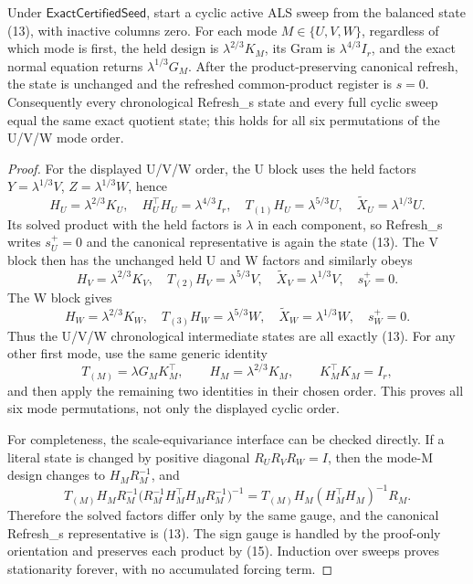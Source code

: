 \begin{proposition}\label{prop:step-013-cyclic-fixed}
Under \(\mathsf{ExactCertifiedSeed}\), start a
cyclic active ALS sweep from the balanced state (13), with inactive columns
zero. For each mode \(M\in\{U,V,W\}\), regardless of which mode is first,
the held design is \(\lambda^{2/3}K_M\), its Gram is
\(\lambda^{4/3}I_r\), and the exact normal equation returns
\(\lambda^{1/3}G_M\). After the product-preserving canonical refresh, the
state is unchanged and the refreshed common-product register is \(s=0\).
Consequently every chronological Refresh\_s state and every full cyclic
sweep equal the same exact quotient state; this holds for all six
permutations of the U/V/W mode order.

\begin{proof}
For the displayed U/V/W order, the U block uses
the held factors \(Y=\lambda^{1/3}V\), \(Z=\lambda^{1/3}W\), hence
\[
H_U=\lambda^{2/3}K_U,\quad H_U^\top H_U=\lambda^{4/3}I_r,\quad
T_{(1)}H_U=\lambda^{5/3}U,\quad
\widetilde X_U=\lambda^{1/3}U.
\tag{16}
\]
Its solved product with the held factors is \(\lambda\) in each component,
so Refresh\_s writes \(s_U^+=0\) and the canonical representative is again
the state (13). The V block then has the unchanged held U and W factors and
similarly obeys
\[
H_V=\lambda^{2/3}K_V,\quad
T_{(2)}H_V=\lambda^{5/3}V,\quad
\widetilde X_V=\lambda^{1/3}V,\quad s_V^+=0.
\tag{17}
\]
The W block gives
\[
H_W=\lambda^{2/3}K_W,\quad
T_{(3)}H_W=\lambda^{5/3}W,\quad
\widetilde X_W=\lambda^{1/3}W,\quad s_W^+=0.
\tag{18}
\]
Thus the U/V/W chronological intermediate states are all exactly (13).
For any other first mode, use the same generic identity
\[
T_{(M)}=\lambda G_MK_M^\top,\qquad
H_M=\lambda^{2/3}K_M,\qquad K_M^\top K_M=I_r,
\tag{19}
\]
and then apply the remaining two identities in their chosen order. This
proves all six mode permutations, not only the displayed cyclic order.

For completeness, the scale-equivariance interface can be checked
directly. If a literal state is changed by positive diagonal
\(R_UR_VR_W=I\), then the mode-M design changes to \(H_MR_M^{-1}\), and
\[
T_{(M)}H_MR_M^{-1}
\big(R_M^{-1}H_M^\top H_MR_M^{-1}\big)^{-1}
=T_{(M)}H_M(H_M^\top H_M)^{-1}R_M.
\tag{20}
\]
Therefore the solved factors differ only by the same gauge, and the
canonical Refresh\_s representative is (13). The sign gauge is handled by
the proof-only orientation and preserves each product by (15). Induction
over sweeps proves stationarity forever, with no accumulated forcing term.



\end{proof}
\end{proposition}
